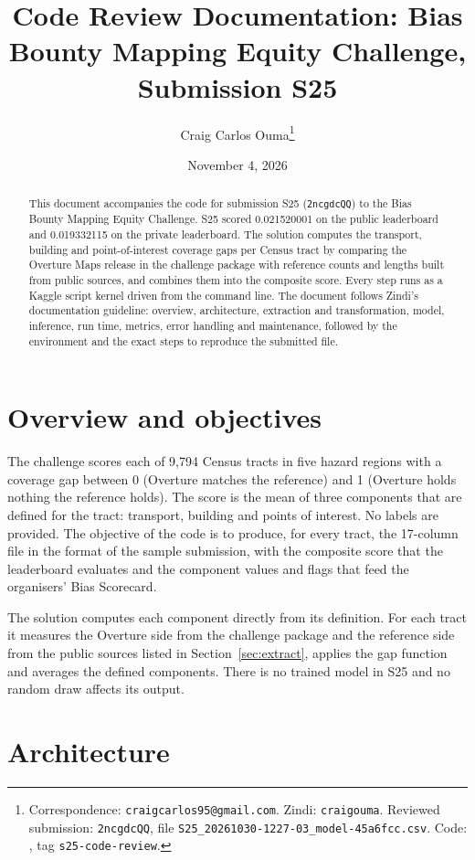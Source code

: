 \documentclass[11pt]{article}
\title{\textbf{Code Review Documentation: Bias Bounty Mapping Equity
Challenge, Submission S25}}
\author[1]{Craig Carlos Ouma\thanks{%
Correspondence: \texttt{craigcarlos95@gmail.com}. Zindi:
\texttt{craigouma}. Reviewed submission: \texttt{2ncgdcQQ}, file
\texttt{S25\_20261030-1227-03\_model-45a6fcc.csv}. Code: \repo, tag
\texttt{s25-code-review}.}}
\affil[1]{Independent Researcher}
\date{November 4, 2026}
\begin{document}
\maketitle

\begin{abstract}
\noindent
This document accompanies the code for submission S25 (\texttt{2ncgdcQQ})
to the Bias Bounty Mapping Equity Challenge. S25 scored 0.021520001 on the
public leaderboard and 0.019332115 on the private leaderboard. The solution
computes the transport, building and point-of-interest coverage gaps per
Census tract by comparing the Overture Maps release in the challenge package
with reference counts and lengths built from public sources, and combines
them into the composite score. Every step runs as a Kaggle script kernel
driven from the command line. The document follows Zindi's documentation
guideline: overview, architecture, extraction and transformation, model,
inference, run time, metrics, error handling and maintenance, followed by the
environment and the exact steps to reproduce the submitted file.
\end{abstract}

\section{Overview and objectives}

The challenge scores each of 9,794 Census tracts in five hazard regions with
a coverage gap between 0 (Overture matches the reference) and 1 (Overture
holds nothing the reference holds). The score is the mean of three
components that are defined for the tract: transport, building and points of
interest. No labels are provided. The objective of the code is to produce,
for every tract, the 17-column file in the format of the sample submission,
with the composite score that the leaderboard evaluates and the component
values and flags that feed the organisers' Bias Scorecard.

The solution computes each component directly from its definition. For
each tract it measures the Overture side from the challenge package and the
reference side from the public sources listed in Section~\ref{sec:extract},
applies the gap function and averages the defined components. There is no
trained model in S25 and no random draw affects its output.

\section{Architecture}
\end{document}
